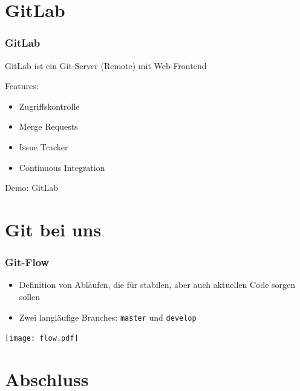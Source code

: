 \documentclass[aspectratio=169]{beamer}
\begin{document}
\section{GitLab}
\begin{frame}
    \frametitle{GitLab}
    GitLab ist ein Git-Server (\glqq{}Remote\grqq{}) mit Web-Frontend
    \pause
    
    \vspace{1cm}

    Features: \pause
    \begin{itemize}
        \item Zugriffskontrolle
            \pause
        \item Merge Requests
            \pause
        \item Issue Tracker
            \pause
        \item Continuous Integration 
    \end{itemize}
\end{frame}

\begin{frame}
    \Huge{Demo: GitLab}
\end{frame}

\section{Git bei uns}
\begin{frame}
    \frametitle{Git-Flow}
    \begin{itemize}
        \item Definition von Abläufen, die für stabilen, aber auch aktuellen Code sorgen sollen
        \item Zwei langläufige Branches: \lstinline{master} und \lstinline{develop}
    \end{itemize}
    \texttt{[image: flow.pdf]}
\end{frame}

\section{Abschluss}
\end{document}
